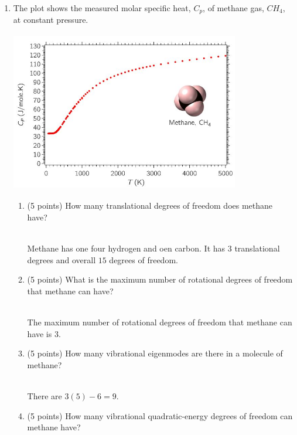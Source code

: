 \documentclass[fleqn]{article}
\begin{document}
\begin{enumerate}
    \pagebreak
    
    \item The plot shows the measured molar specific heat, $C_p$, of methane gas, $CH_4$, at constant pressure.
    \begin{center}
      \includegraphics[height=7cm, width=10cm]{question4.JPG}
    \end{center}
    \begin{enumerate}
      \item (5 points) How many translational degrees of freedom does methane have?

        \textcolor{hwColor}{
          \\
          Methane has one four hydrogen and oen carbon. It has $3$ translational degrees and overall $15$
          degrees of freedom.
          \\
        }

      \item (5 points) What is the maximum number of rotational degrees of freedom that methane can
      have?

        \textcolor{hwColor}{
          \\
          The maximum number of rotational degrees of freedom that methane can
          have is $3$.
          \\
        }

      \item (5 points) How many vibrational eigenmodes are there in a molecule of methane?

        \textcolor{hwColor}{
          \\
          There are $3(5)-6=9$.
          \\
        }

      \item (5 points) How many vibrational quadratic-energy degrees of freedom can methane have?


\end{enumerate}
\end{enumerate}
\end{document}
